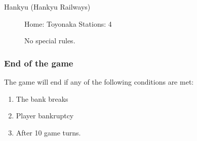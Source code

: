 \begin{multicols}{2}
\begin{description}
\item[Hankyu (Hankyu Railways)]\hfill

Home: Toyonaka \hfill
Stations: 4

No special rules.
\end{description}

\subsubsection{End of the game}

The game will end if any of the following conditions are met:
\begin{enumerate}
\item The bank breaks

\item Player bankruptcy

\item After 10 game turns.
\end{enumerate}

\end{multicols}

